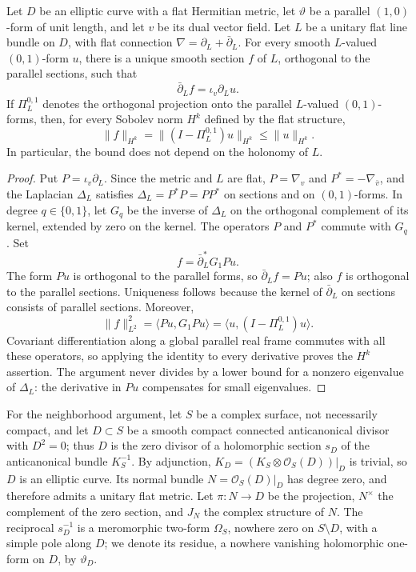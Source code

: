 \begin{lemma}\label{lem:flat-elliptic-derivative-inverse}
Let $D$ be an elliptic curve with a flat Hermitian metric, let $\vartheta$ be a parallel $(1,0)$-form of unit length, and let $v$ be its dual vector field. Let $L$ be a unitary flat line bundle on $D$, with flat connection $\nabla=\partial_L+\bar\partial_L$. For every smooth $L$-valued $(0,1)$-form $u$, there is a unique smooth section $f$ of $L$, orthogonal to the parallel sections, such that
\[
 \bar\partial_L f=\iota_v\partial_Lu.
\]
If $\Pi_L^{0,1}$ denotes the orthogonal projection onto the parallel $L$-valued $(0,1)$-forms, then, for every Sobolev norm $H^k$ defined by the flat structure,
\[
 \|f\|_{H^k}=\|(I-\Pi_L^{0,1})u\|_{H^k}
 \leq\|u\|_{H^k}.
\]
In particular, the bound does not depend on the holonomy of $L$.
\end{lemma}
\begin{proof}
Put $P=\iota_v\partial_L$. Since the metric and $L$ are flat, $P=\nabla_v$ and $P^*=-\nabla_{\bar v}$, and the Laplacian $\Delta_L$ satisfies $\Delta_L=P^*P=PP^*$ on sections and on $(0,1)$-forms. In degree $q\in\{0,1\}$, let $G_q$ be the inverse of $\Delta_L$ on the orthogonal complement of its kernel, extended by zero on the kernel. The operators $P$ and $P^*$ commute with $G_q$. Set
\[
 f=\bar\partial_L^*G_1Pu.
\]
The form $Pu$ is orthogonal to the parallel forms, so $\bar\partial_Lf=Pu$; also $f$ is orthogonal to the parallel sections. Uniqueness follows because the kernel of $\bar\partial_L$ on sections consists of parallel sections. Moreover,
\[
 \|f\|_{L^2}^2
 =\langle Pu,G_1Pu\rangle
 =\langle u,(I-\Pi_L^{0,1})u\rangle.
\]
Covariant differentiation along a global parallel real frame commutes with all these operators, so applying the identity to every derivative proves the $H^k$ assertion. The argument never divides by a lower bound for a nonzero eigenvalue of $\Delta_L$: the derivative in $Pu$ compensates for small eigenvalues.
\end{proof}

For the neighborhood argument, let $S$ be a complex surface, not necessarily compact, and let $D\subset S$ be a smooth compact connected anticanonical divisor with $D^2=0$; thus $D$ is the zero divisor of a holomorphic section $s_D$ of the anticanonical bundle $K_S^{-1}$. By adjunction, $K_D=(K_S\otimes\mathcal O_S(D))|_D$ is trivial, so $D$ is an elliptic curve. Its normal bundle $N=\mathcal O_S(D)|_D$ has degree zero, and therefore admits a unitary flat metric. Let $\pi\colon N\to D$ be the projection, $N^\times$ the complement of the zero section, and $J_N$ the complex structure of $N$. The reciprocal $s_D^{-1}$ is a meromorphic two-form $\Omega_S$, nowhere zero on $S\setminus D$, with a simple pole along $D$; we denote its residue, a nowhere vanishing holomorphic one-form on $D$, by $\vartheta_D$.

